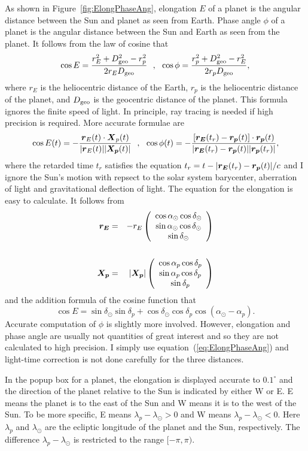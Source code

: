 \documentclass[12pt]{article}
\newcommand \beq {\begin{equation}}
\newcommand \eeq {\end{equation}}
\newcommand \beqn {\begin{eqnarray}}
\newcommand \eeqn {\end{eqnarray}}
\newcommand{\ve}[1]{\mbox{\boldmath $#1$}}
\begin{document}
As shown in Figure~\ref{fig:ElongPhaseAng}, elongation $E$ of a planet is the angular 
distance between the Sun and planet as seen from Earth. Phase angle $\phi$ of a planet 
is the angular distance between the Sun and Earth as seen from the planet. It follows 
from the law of cosine that 
\beq
  \cos E = \frac{r_E^2 + D_{\rm geo}^2 - r_p^2}{2 r_E D_{\rm geo}} \ \ , \ \ 
  \cos \phi = \frac{r_p^2 + D_{\rm geo}^2 - r_E^2}{2 r_p D_{\rm geo}} ,
\label{eq:ElongPhaseAng}
\eeq
where $r_E$ is the heliocentric distance of the Earth, $r_p$ is the heliocentric 
distance of the planet, and $D_{\rm geo}$ is the geocentric distance of the 
planet. This formula ignores the finite speed of light. 
In principle, ray tracing is needed if high precision 
is required. More accurate formulae are 
\beq
  \cos E(t) = -\frac{\ve{r}_E(t) \cdot \ve{X}_p(t)}{|\ve{r}_E(t)| |\ve{X_p}(t)|} \ \ , \ \ 
  \cos \phi(t) = -\frac{[\ve{r_E}(t_r)-\ve{r_p}(t)] \cdot \ve{r_p}(t)}
{|\ve{r_E}(t_r)-\ve{r_p}(t)| |\ve{r_p}(t_r)|} ,
\eeq
where the retarded time $t_r$ satisfies the equation 
$t_r=t-|\ve{r_E}(t_r)-\ve{r_p}(t)|/c$ and I ignore 
the Sun's motion with repsect to the solar system barycenter, aberration 
of light and gravitational deflection of light.
The equation for the elongation is easy to calculate. It follows 
from 
\beqn
  \ve{r_E} &=& - r_E \left( \begin{array}{c} 
\cos \alpha_{\odot} \cos \delta_{\odot} \\ 
\sin \alpha_{\odot} \cos \delta_{\odot} \\ 
\sin \delta_{\odot} \end{array} \right) \\ \cr 
\ve{X_p} &=& |\ve{X_p}| \left( \begin{array}{c} 
\cos \alpha_p \cos \delta_p \\ \sin \alpha_p \cos \delta_p \\ \sin \delta_p 
\end{array} \right)
\eeqn
and the addition formula of the cosine function that 
\beq
  \cos E = \sin \delta_{\odot} \sin \delta_p + 
\cos \delta_{\odot} \cos \delta_p \cos (\alpha_{\odot} - \alpha_p) .
\label{eq:Elong}
\eeq
Accurate computation of $\phi$ is slightly more involved. 
However, elongation and phase angle are usually not
quantities of great interest and so they are not calculated to 
high precision. I simply use 
equation~(\ref{eq:ElongPhaseAng}) and light-time correction is not done 
carefully for the three distances. 

In the popup box for a planet, the elongation is displayed accurate to $0.1^\circ$ 
and the direction of the planet relative to the Sun is indicated by either W or E. 
E means the planet is to the east of 
the Sun and W means it is to the west of the Sun. To be more specific, E means 
$\lambda_p-\lambda_{\odot} > 0$ and W means $\lambda_p-\lambda_{\odot} <0$. 
Here $\lambda_p$ and $\lambda_{\odot}$ are the ecliptic longitude of the planet 
and the Sun, respectively. The difference $\lambda_p-\lambda_{\odot}$ is restricted 
to the range $[-\pi,\pi)$.
\end{document}
